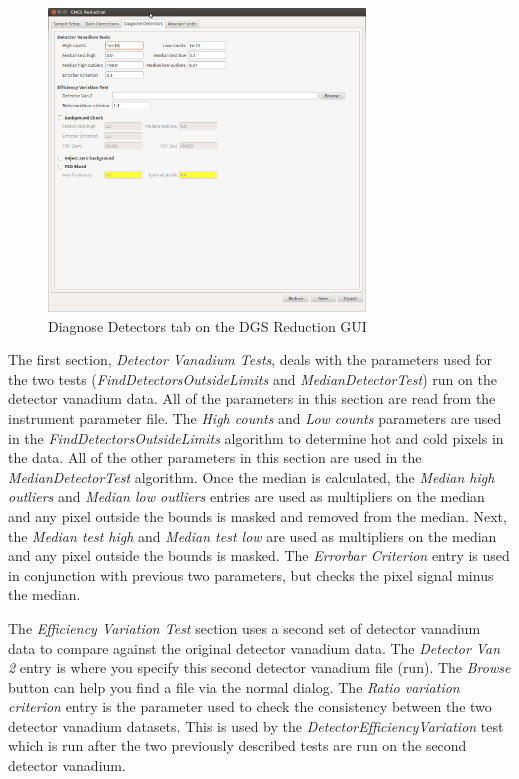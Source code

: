 \begin{figure}[ht]
\centerline{\includegraphics[width=0.75\textwidth]{figures/DiagnoseDetectors.png}}
\caption{Diagnose Detectors tab on the DGS Reduction GUI}
\label{fig:DiagDet}
\end{figure}

The first section, \textit{Detector Vanadium Tests}, deals with the parameters used for the two tests (\textit{FindDetectorsOutsideLimits} and \textit{MedianDetectorTest}) run on the detector vanadium data. All of the parameters in this section are read from the instrument parameter file. The \textit{High counts} and \textit{Low counts} parameters are used in the \textit{FindDetectorsOutsideLimits} algorithm to determine hot and cold pixels in the data. All of the other parameters in this section are used in the \textit{MedianDetectorTest} algorithm. Once the median is calculated, the \textit{Median high outliers} and \textit{Median low outliers} entries are used as multipliers on the median and any pixel outside the bounds is masked and removed from the median. Next, the \textit{Median test high} and \textit{Median test low} are used as multipliers on the median and any pixel outside the bounds is masked. The \textit{Errorbar Criterion} entry is used in conjunction with previous two parameters, but checks the pixel signal minus the median.

The \textit{Efficiency Variation Test} section uses a second set of detector vanadium data to compare against the original detector vanadium data. The \textit{Detector Van 2} entry is where you specify this second detector vanadium file (run). The \textit{Browse} button can help you find a file via the normal dialog. The \textit{Ratio variation criterion} entry is the parameter used to check the consistency between the two detector vanadium datasets. This is used by the \textit{DetectorEfficiencyVariation} test which is run after the two previously described tests are run on the second detector vanadium.

